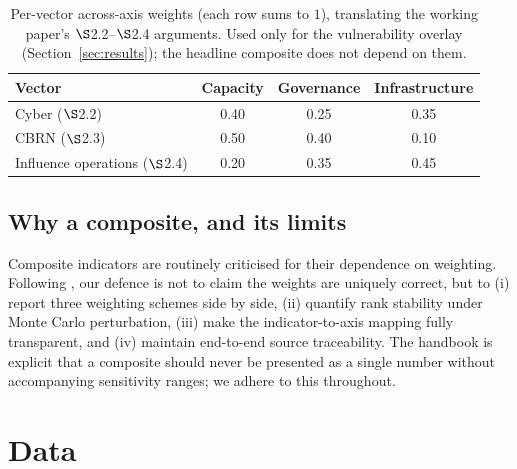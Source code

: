 \documentclass[11pt]{article}
\begin{document}
\begin{table}[t]
\centering
\caption{Per-vector across-axis weights (each row sums to $1$), translating the working paper's $\S$2.2--$\S$2.4 arguments. Used only for the vulnerability overlay (Section~\ref{sec:results}); the headline composite does not depend on them.}
\label{tab:vectorweights}
\small
\begin{tabular}{@{}lccc@{}}
\toprule
\textbf{Vector} & \textbf{Capacity} & \textbf{Governance} & \textbf{Infrastructure} \\
\midrule
Cyber ($\S$2.2)                 & 0.40 & 0.25 & 0.35 \\
CBRN ($\S$2.3)                  & 0.50 & 0.40 & 0.10 \\
Influence operations ($\S$2.4)  & 0.20 & 0.35 & 0.45 \\
\bottomrule
\end{tabular}
\end{table}

\subsection{Why a composite, and its limits}
Composite indicators are routinely criticised for their dependence on weighting. Following \citet{oecd2008handbook}, our defence is not to claim the weights are uniquely correct, but to (i) report three weighting schemes side by side, (ii) quantify rank stability under Monte Carlo perturbation, (iii) make the indicator-to-axis mapping fully transparent, and (iv) maintain end-to-end source traceability. The handbook is explicit that a composite should never be presented as a single number without accompanying sensitivity ranges; we adhere to this throughout.

\section{Data}\label{sec:data}
\end{document}

